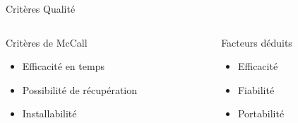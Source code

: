 \begin{frame}{Critères Qualité}
  \begin{columns}[t]
    \begin{column}{5.5cm}
      \begin{block}{Critères de McCall}
	\onslide<2,3,4,5,6,7>
	\begin{itemize}
	\item Efficacité en temps
	\onslide<4,5,6,7>
	\item Possibilité de récupération
	\onslide<6,7>
	\item Installabilité
	\end{itemize}
      \end{block}
    \end{column}

    \begin{column}{5.5cm}
      \begin{block}{Facteurs déduits}
	\onslide<2>
	\begin{itemize}
	  \item Efficacité
	  \onslide<5,6,7>
	  \item Fiabilité
	  \onslide<7>
	  \item Portabilité
	\end{itemize}
      \end{block}
    \end{column}
  \end{columns}
\end{frame}
